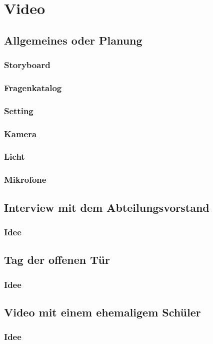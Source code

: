 \section{Video}
\subsection{Allgemeines oder Planung}
\subsubsection{Storyboard}
\subsubsection{Fragenkatalog}
\subsubsection{Setting}
\subsubsection{Kamera}
\subsubsection{Licht}
\subsubsection{Mikrofone}

\subsection{Interview mit dem Abteilungsvorstand}
\subsubsection{Idee}
\subsection{Tag der offenen Tür}
\subsubsection{Idee}
\subsection{Video mit einem ehemaligem Schüler}
\subsubsection{Idee}

